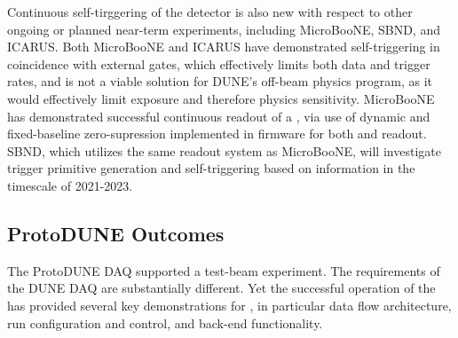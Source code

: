 Continuous self-tirggering of the detector is also new with respect to
other ongoing or planned near-term  experiments, including
MicroBooNE, SBND, and ICARUS. Both MicroBooNE and ICARUS have demonstrated
self-triggering in coincidence with external gates, which effectively
limits both data and trigger rates, and is not a viable solution for
DUNE's off-beam physics program, as it would effectively limit
exposure and therefore physics sensitivity. %
MicroBooNE has demonstrated successful continuous readout of a ,
via use of dynamic and fixed-baseline zero-supression implemented in
firmware for both  and  readout. SBND, which utilizes the same readout
system as MicroBooNE, will investigate trigger primitive generation
and self-triggering based on  information in the timescale of 2021-2023.


\subsection{ProtoDUNE Outcomes}

The ProtoDUNE DAQ supported a test-beam experiment. The requirements of the DUNE DAQ are substantially different.
Yet the successful operation of the   has provided several key demonstrations for  , in particular data flow architecture, run configuration and control, and back-end functionality.

